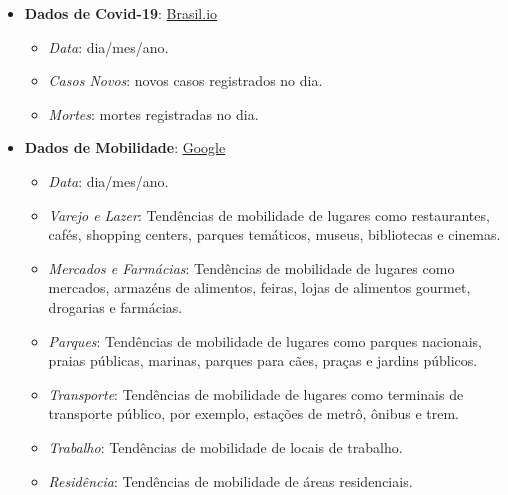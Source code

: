 \documentclass[
]{book}
\providecommand{\tightlist}{%
  \setlength{\itemsep}{0pt}\setlength{\parskip}{0pt}}
\begin{document}
\begin{itemize}
\tightlist
\item
  \textbf{Dados de Covid-19}: \href{https://brasil.io/}{Brasil.io}

  \begin{itemize}
  \tightlist
  \item
    \emph{Data}: dia/mes/ano.\\
  \item
    \emph{Casos Novos}: novos casos registrados no dia.\\
  \item
    \emph{Mortes}: mortes registradas no dia.
  \end{itemize}
\item
  \textbf{Dados de Mobilidade}: \href{https://www.google.com/covid19/mobility/}{Google}

  \begin{itemize}
  \tightlist
  \item
    \emph{Data}: dia/mes/ano.\\
  \item
    \emph{Varejo e Lazer}: Tendências de mobilidade de lugares como restaurantes, cafés, shopping centers, parques temáticos, museus, bibliotecas e cinemas.\\
  \item
    \emph{Mercados e Farmácias}: Tendências de mobilidade de lugares como mercados, armazéns de alimentos, feiras, lojas de alimentos gourmet, drogarias e farmácias.\\
  \item
    \emph{Parques}: Tendências de mobilidade de lugares como parques nacionais, praias públicas, marinas, parques para cães, praças e jardins públicos.\\
  \item
    \emph{Transporte}: Tendências de mobilidade de lugares como terminais de transporte público, por exemplo, estações de metrô, ônibus e trem.\\
  \item
    \emph{Trabalho}: Tendências de mobilidade de locais de trabalho.\\
  \item
    \emph{Residência}: Tendências de mobilidade de áreas residenciais.
  \end{itemize}
\end{itemize}
\end{document}
